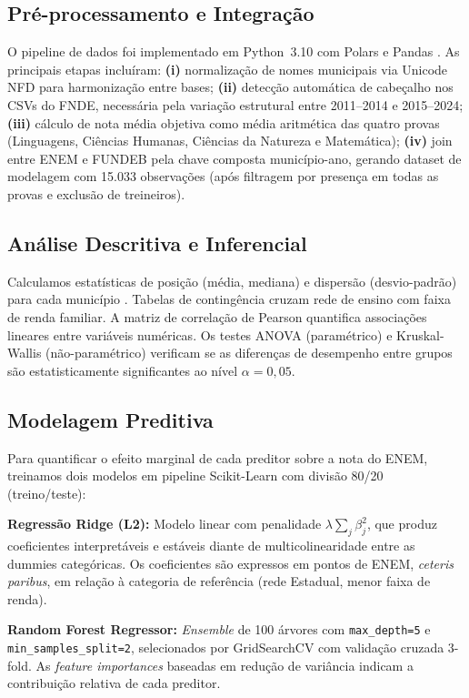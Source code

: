 \documentclass[12pt]{article}
\begin{document}
\subsection{Pré-processamento e Integração}

O pipeline de dados foi implementado em Python~3.10 com Polars e Pandas \cite{mckinney2023}.
As principais etapas incluíram: \textbf{(i)} normalização de nomes municipais via
Unicode NFD para harmonização entre bases; \textbf{(ii)} detecção automática de
cabeçalho nos CSVs do FNDE, necessária pela variação estrutural entre 2011--2014 e
2015--2024; \textbf{(iii)} cálculo de nota média objetiva como média aritmética das
quatro provas (Linguagens, Ciências Humanas, Ciências da Natureza e Matemática);
\textbf{(iv)} join entre ENEM e FUNDEB pela chave composta município-ano, gerando
dataset de modelagem com 15.033 observações (após filtragem por presença em todas as
provas e exclusão de treineiros).

\subsection{Análise Descritiva e Inferencial}

Calculamos estatísticas de posição (média, mediana) e dispersão (desvio-padrão) para
cada município \cite{bussabmorettin2024}. Tabelas de contingência cruzam rede de ensino com faixa de renda
familiar. A matriz de correlação de Pearson quantifica associações lineares entre
variáveis numéricas. Os testes ANOVA (paramétrico) e Kruskal-Wallis (não-paramétrico)
verificam se as diferenças de desempenho entre grupos são estatisticamente significantes
ao nível $\alpha = 0{,}05$.

\subsection{Modelagem Preditiva}

Para quantificar o efeito marginal de cada preditor sobre a nota do ENEM, treinamos
dois modelos em pipeline Scikit-Learn com divisão 80/20 (treino/teste):

\textbf{Regressão Ridge (L2):} Modelo linear com penalidade $\lambda\sum_{j}\beta_j^2$,
que produz coeficientes interpretáveis e estáveis diante de multicolinearidade entre
as dummies categóricas. Os coeficientes são expressos em pontos de ENEM, \textit{ceteris
paribus}, em relação à categoria de referência (rede Estadual, menor faixa de renda).

\textbf{Random Forest Regressor:} \textit{Ensemble} de 100 árvores com
\texttt{max\_depth=5} e \texttt{min\_samples\_split=2}, selecionados por GridSearchCV
com validação cruzada 3-fold. As \textit{feature importances} baseadas em redução de
variância indicam a contribuição relativa de cada preditor.
\end{document}
